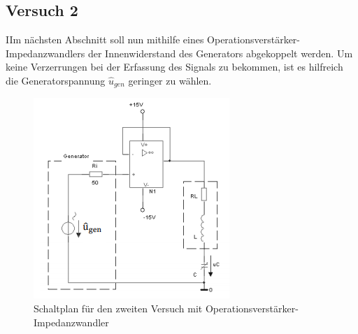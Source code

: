 \documentclass{article}
\begin{document}
\subsection{Versuch 2}

\begin{task}
  IIm nächsten Abschnitt soll nun mithilfe eines Operationsverstärker-Impedanzwandlers
  der Innenwiderstand des Generators abgekoppelt werden. Um keine Verzerrungen bei der Erfassung
  des Signals zu bekommen, ist es hilfreich die Generatorspannung $\hat{u}_{gen}$ geringer zu wählen.
\end{task}
\begin{figure}[h]
  \begin{center}
    \includegraphics{../assets/images/ETP3/Versuch2Schaltplan.PNG}
    \caption{Schaltplan für den zweiten Versuch mit Operationsverstärker-Impedanzwandler}
  \end{center}
\end{figure}
\end{document}
